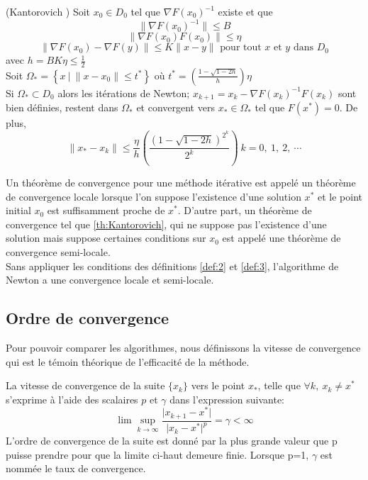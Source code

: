 \begin{frtheoreme}(Kantorovich \cite{Kantorovich})
\label{th:Kantorovich}
Soit $x_0 \in D_0$ tel que $\nabla F(x_0)^{-1}$ existe et que \\
$$\lVert \nabla F(x_0)^{-1} \rVert \leq B$$
$$\lVert \nabla F(x_0)F(x_0) \rVert \leq \eta$$
$$ \lVert \nabla F(x_0)- \nabla F(y)\rVert \leq K\lVert x-y \rVert \text{ pour tout }x\text{ et }y\text{ dans }D_0 $$
avec $h=BK\eta \leq \frac{1}{2}$\\
Soit $\Omega_*=\left\{x\ |\ \lVert x-x_0 \rVert \leq t^*\right\}$ o\`u $t^*=\left(\frac{1-\sqrt{1-2h}}{h} \right)\eta$\\
Si $\Omega_* \subset D_0$ alors les it\'erations de Newton; $x_{k+1}=x_k-\nabla F(x_k)^{-1}F(x_k)$ sont bien
d\'efinies, restent dans $\Omega_*$ et convergent vers $x_*\in \Omega_*$ tel que $F(x^*)=0$. De plus,
$$\lVert x_*-x_k \rVert \leq \frac{\eta}{h}\left(\frac{(1-\sqrt{1-2h})^{2^k}}{2^k}\right)\ k=0,\ 1,\ 2,\ \cdots$$
\end{frtheoreme}


Un th\'eor\`eme de convergence pour une m\'ethode it\'erative est appel\'e un th\'eor\`eme de convergence 
locale lorsque l'on suppose l'existence d'une solution $x^*$ et le point initial $x_0$ est 
suffisamment proche de $x^*$. D'autre part, un th\'eor\`eme de convergence tel que \ref{th:Kantorovich},
qui ne suppose pas l'existence d'une solution mais suppose certaines conditions sur $x_0$ est
appel\'e une th\'eor\`eme de convergence semi-locale.\\

Sans appliquer les conditions des d\'efinitions \ref{def:2} et \ref{def:3}, l'algorithme de Newton
a une convergence locale et semi-locale. 



\subsection{Ordre de convergence}
Pour pouvoir comparer les algorithmes, nous d\'efinissons la vitesse de convergence qui 
est le t\'emoin th\'eorique de l'efficacit\'e de la m\'ethode.

\begin{frdefinition}
\label{def:convergence}
La vitesse de convergence de la suite $\{x_k\}$ vers le point $x_*$, telle que $\forall k,\ x_k \neq x^*$ s'exprime 
\`a l'aide des scalaires $p$ et $\gamma$ dans l'expression suivante:
$$\lim \sup_{k\rightarrow \infty}\frac{\lvert x_{k+1}-x^*\rvert}{\lvert x_k-x^* \rvert^p}=\gamma< \infty $$
L'ordre de convergence de la suite est donn\'e par la plus grande valeur que p puisse prendre pour que la limite 
ci-haut demeure finie. Lorsque p=1, $\gamma$ est nomm\'ee le taux de convergence.
\end{frdefinition}

